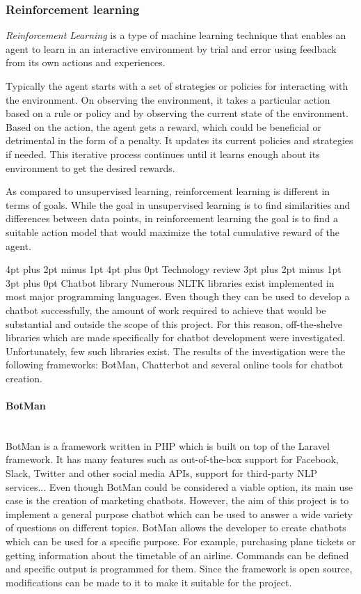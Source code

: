 \documentclass[12pt,a4paper]{article}
\makeatletter
\newcommand{\myparagraph}[1]{\paragraph{#1}\mbox{}\\}
\renewcommand\subsection{\@startsection {subsection}{1}{2mm} %
                                        {3pt plus 2pt minus 1pt} %
                                        {3pt plus 0pt} %
                                        {\normalfont\bfseries}}
\renewcommand\section{\@startsection {section}{1}{0mm} %
                                     {4pt plus 2pt minus 1pt} %
                                     {4pt plus 0pt} %
                                     {\bfseries}}
\makeatother
\begin{document}
\subsubsection{Reinforcement learning}
\textit{Reinforcement Learning} is a type of machine learning technique that enables an agent to learn in an interactive environment by trial and error using feedback from its own actions and experiences.

Typically the agent starts with a set of strategies or policies for interacting with the environment. On observing the environment, it takes a particular action based on a rule or policy and by observing the current state of the environment. Based on the action, the agent gets a reward, which could be beneficial or detrimental in the form of a penalty. It updates its current policies and strategies if needed. This iterative process continues until it learns enough about its environment to get the desired rewards.

As compared to unsupervised learning, reinforcement learning is different in terms of goals. While the goal in unsupervised learning is to find similarities and differences between data points, in reinforcement learning the goal is to find a suitable action model that would maximize the total cumulative reward of the agent.

\newpage
\section{Technology review}
\subsection{Chatbot library}
Numerous NLTK libraries exist implemented in most major programming languages. Even though they can be used to develop a chatbot successfully, the amount of work required to achieve that would be substantial and outside the scope of this project. For this reason, off-the-shelve libraries which are made specifically for chatbot development were investigated. Unfortunately, few such libraries exist. The results of the investigation were the following frameworks: BotMan, Chatterbot and several online tools for chatbot creation.

\myparagraph{BotMan}
BotMan is a framework written in PHP which is built on top of the Laravel framework. It has many features such as out-of-the-box support for Facebook, Slack, Twitter and other social media APIs, support for third-party NLP services... Even though BotMan could be considered a viable option, its main use case is the creation of marketing chatbots. However, the aim of this project is to implement a general purpose chatbot which can be used to answer a wide variety of questions on different topics. BotMan allows the developer to create chatbots which can be used for a specific purpose. For example, purchasing plane tickets or getting information about the timetable of an airline. Commands can be defined and specific output is programmed for them. Since the framework is open source, modifications can be made to it to make it suitable for the project.
\end{document}
